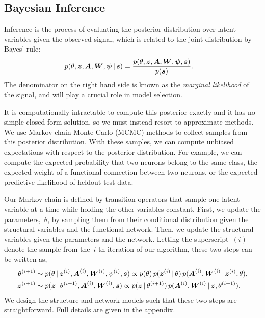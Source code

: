 \subsection{Bayesian Inference}
Inference is the process of evaluating the posterior distribution over latent variables given the observed signal, which is related to the joint distribution by Bayes' rule:
\begin{align}
p(\theta, \boldsymbol{z}, \boldsymbol{A}, \boldsymbol{W}, \boldsymbol{\psi} \,|\, \boldsymbol{s}) &= \frac{p(\theta, \boldsymbol{z}, \boldsymbol{A}, \boldsymbol{W}, \boldsymbol{\psi}, \boldsymbol{s}) }{p(\boldsymbol{s})}.
\end{align}
The denominator on the right hand side is known as the \emph{marginal likelihood} of the signal, and will play a crucial role in model selection. 

It is computationally intractable to compute this posterior exactly and it has no simple closed form solution, so we must instead resort to approximate methods. 
We use Markov chain Monte Carlo (MCMC) methods to collect samples from this posterior distribution.
With these samples, we can compute unbiased expectations with respect to the posterior distribution.
For example, we can compute the expected probability that two neurons belong to the same class, the expected weight of a functional connection between two neurons, or the expected predictive likelihood of heldout test data.

Our Markov chain is defined by transition operators that sample one latent variable at a time while holding the other variables constant. First, we update the parameters,~$\theta$, by sampling them from their conditional distribution given the structural variables and the functional network. Then, we update the structural variables given the parameters and the network. Letting the superscript~$(i)$ denote the sample from the~$i$-th iteration of our algorithm, these two steps can be written as,
\begin{align}
\theta^{(i+1)} &\sim p(\theta \,|\, \boldsymbol{z}^{(i)}, \boldsymbol{A}^{(i)}, \boldsymbol{W}^{(i)}, \psi^{(i)}, \boldsymbol{s}) 
\propto p(\theta) \, p(\boldsymbol{z}^{(i)} \,|\, \theta) \, p(\boldsymbol{A}^{(i)}, \boldsymbol{W}^{(i)} \,|\, \boldsymbol{z}^{(i)}, \theta),\\
\boldsymbol{z}^{(i+1)} &\sim p(\boldsymbol{z} \,|\, \theta^{(i+1)}, \boldsymbol{A}^{(i)}, \boldsymbol{W}^{(i)}, \boldsymbol{s}) 
\propto p(\boldsymbol{z} \,|\, \theta^{(i+1)}) \, p(\boldsymbol{A}^{(i)}, \boldsymbol{W}^{(i)} \,|\, \boldsymbol{z}, \theta^{(i+1)}).
\end{align}
We design the structure and network models such that these two steps are straightforward. Full details are given in the appendix.

